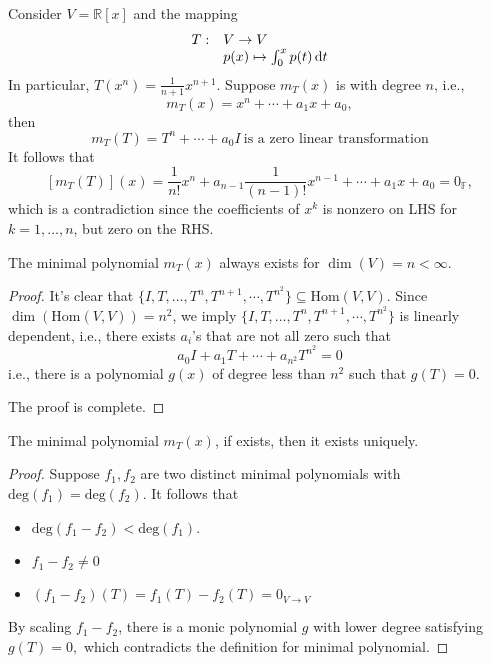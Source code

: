 \begin{example}
Consider $V=\mathbb{R}[x]$ and the mapping
\[
\begin{array}{ll}
T:&V\to V\\
&p(x)\mapsto\int_0^xp(t)\,\mathrm{d} t
\end{array}
\]
In particular, $T(x^n)=\frac{1}{n+1}x^{n+1}$.
Suppose $m_T(x)$ is with degree $n$, i.e., 
\[
m_T(x) = x^n +\cdots+a_1x+a_0,
\]
then 
\[
m_T(T)=T^n+\cdots+a_0I\ \text{is a zero linear transformation}
\]
It follows that
\[
[m_T(T)](x) = \frac{1}{n!}x^n+a_{n-1}\frac{1}{(n-1)!}x^{n-1}+\cdots+a_1x+a_0=0_{\mathbb{F}},
\]
which is a contradiction since
the coefficients of $x^k$ is nonzero on LHS for $k=1,\dots,n$, but zero on the RHS.
\end{example}

\begin{proposition}
The minimal polynomial $m_T(x)$ always exists for $\dim(V)=n<\infty$.
\end{proposition}
\begin{proof}
It's clear that $\{I,T,\dots,T^n,T^{n+1},\cdots,T^{n^2}\}\subseteq\text{Hom}(V,V).$
Since $\dim(\text{Hom}(V,V))=n^2$, we imply $\{I,T,\dots,T^n,T^{n+1},\cdots,T^{n^2}\}$ is linearly dependent, i.e., there exists $a_i$'s that are not all zero such that
\[
a_0I+a_1T+\cdots+a_{n^2}T^{n^2}=0
\]
i.e., there is a polynomial $g(x)$ of degree less than $n^2$ such that $g(T)=0$.

The proof is complete.
\end{proof}

\begin{proposition}
The minimal polynomial $m_T(x)$, if exists, then it exists uniquely.
\end{proposition}
\begin{proof}
Suppose $f_1,f_2$ are two distinct minimal polynomials with $\text{deg}(f_1)=\text{deg}(f_2)$.
It follows that
\begin{itemize}
\item
$\text{deg}(f_1-f_2)<\text{deg}(f_1)$.
\item
$f_1-f_2\ne0$
\item
$(f_1-f_2)(T) = f_1(T) - f_2(T)=0_{V\to V}$
\end{itemize}
By scaling $f_1-f_2$, there is a monic polynomial $g$ with lower degree satisfying $g(T)=0,$
which contradicts the definition for minimal polynomial.
\end{proof}

